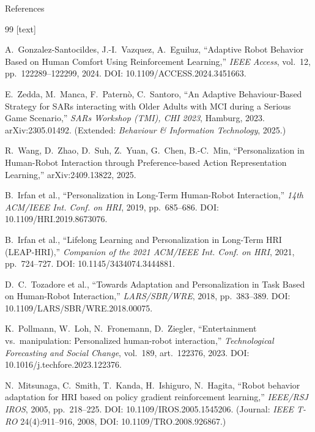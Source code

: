 \documentclass[aspectratio=169,10pt]{beamer}
\begin{document}
\begin{frame}[allowframebreaks]{References}
  \footnotesize
  \begin{thebibliography}{99}
    [text]

     A.\ Gonzalez-Santocildes, J.-I.\ Vazquez, A.\ Eguiluz,
      ``Adaptive Robot Behavior Based on Human Comfort Using Reinforcement Learning,''
      \emph{IEEE Access}, vol.\ 12, pp.\ 122289--122299, 2024.
      DOI: 10.1109/ACCESS.2024.3451663.

     E.\ Zedda, M.\ Manca, F.\ Patern\`o, C.\ Santoro,
      ``An Adaptive Behaviour-Based Strategy for SARs interacting with Older Adults with MCI during a Serious Game Scenario,''
      \emph{SARs Workshop (TMI), CHI 2023}, Hamburg, 2023. arXiv:2305.01492.
      (Extended: \emph{Behaviour \& Information Technology}, 2025.)

     R.\ Wang, D.\ Zhao, D.\ Suh, Z.\ Yuan, G.\ Chen, B.-C.\ Min,
      ``Personalization in Human-Robot Interaction through Preference-based Action Representation Learning,''
      arXiv:2409.13822, 2025.

     B.\ Irfan et al.,
      ``Personalization in Long-Term Human-Robot Interaction,''
      \emph{14th ACM/IEEE Int. Conf. on HRI}, 2019, pp.\ 685--686.
      DOI: 10.1109/HRI.2019.8673076.

     B.\ Irfan et al.,
      ``Lifelong Learning and Personalization in Long-Term HRI (LEAP-HRI),''
      \emph{Companion of the 2021 ACM/IEEE Int. Conf. on HRI}, 2021, pp.\ 724--727.
      DOI: 10.1145/3434074.3444881.

     D.\ C.\ Tozadore et al.,
      ``Towards Adaptation and Personalization in Task Based on Human-Robot Interaction,''
      \emph{LARS/SBR/WRE}, 2018, pp.\ 383--389.
      DOI: 10.1109/LARS/SBR/WRE.2018.00075.

     K.\ Pollmann, W.\ Loh, N.\ Fronemann, D.\ Ziegler,
      ``Entertainment vs.\ manipulation: Personalized human-robot interaction,''
      \emph{Technological Forecasting and Social Change}, vol.\ 189, art.\ 122376, 2023.
      DOI: 10.1016/j.techfore.2023.122376.

     N.\ Mitsunaga, C.\ Smith, T.\ Kanda, H.\ Ishiguro, N.\ Hagita,
      ``Robot behavior adaptation for HRI based on policy gradient reinforcement learning,''
      \emph{IEEE/RSJ IROS}, 2005, pp.\ 218--225. DOI: 10.1109/IROS.2005.1545206.
      (Journal: \emph{IEEE T-RO} 24(4):911--916, 2008, DOI: 10.1109/TRO.2008.926867.)


\end{thebibliography}
\end{frame}
\end{document}
